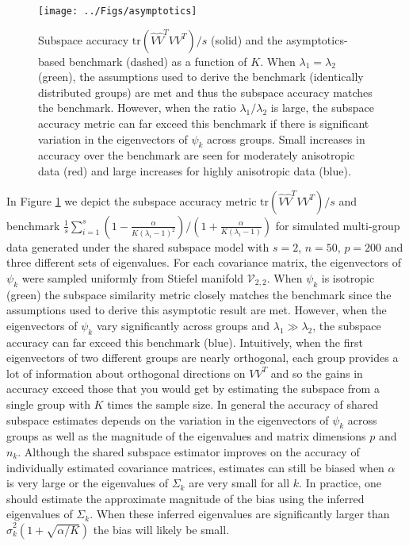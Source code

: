 \documentclass{statsoc}
\newcommand{\tr}{\text{tr}}
\begin{document}
\begin{figure}[t]
    \centering
    \texttt{[image: ../Figs/asymptotics]}
    \caption{Subspace accuracy $\tr(\hat{V}\hat{V}^TVV^T)/s$ (solid)
      and the asymptotics-based benchmark (dashed)
      as a function of $K$.  When
      $\lambda_1=\lambda_2$ (green), the assumptions used to derive
      the benchmark (identically distributed groups) are met and thus the
      subspace accuracy matches the benchmark.  However, when the
      ratio $\lambda_1/\lambda_2$ is large, the subspace accuracy
      metric can far exceed this benchmark if there is significant
      variation in the eigenvectors of $\psi_k$ across groups.  Small
      increases in accuracy over the benchmark are seen for moderately
      anisotropic data (red) and large increases for highly
      anisotropic data (blue).  }
      \label{fig:asymptotics}
\end{figure}


In Figure \ref{fig:asymptotics} we depict the subspace accuracy metric
$\tr(\hat{V}\hat{V}^TVV^T)/s$ and benchmark
$\frac{1}{s}\sum_{i=1}^s \left(1-\frac{\alpha}{K(\lambda_i -
    1)^2}\right) /\left(1 + \frac{\alpha}{K(\lambda_i - 1)}\right)$
for simulated multi-group data generated under the shared subspace
model with $s=2$, $n=50$, $p=200$ and three different sets of eigenvalues.  For each
covariance matrix, the eigenvectors of $\psi_k$ were sampled uniformly
from Stiefel manifold $\mathcal{V}_{2,2}$.  When $\psi_k$ is isotropic
(green) the subspace similarity metric closely matches the benchmark
since the assumptions used to derive this asymptotic result are met.
However, when the eigenvectors of $\psi_k$ vary significantly across
groups and $\lambda_1 \gg \lambda_2$, the subspace accuracy can far
exceed this benchmark (blue).  Intuitively, when the first
eigenvectors of two different groups are nearly orthogonal, each group
provides a lot of information about orthogonal directions on $VV^T$
and so the gains in accuracy exceed those that you would get by
estimating the subspace from a single group with $K$ times the sample
size.  In general the accuracy of shared subspace estimates depends on
the variation in the eigenvectors of $\psi_k$ across groups as well as
the magnitude of the eigenvalues and matrix dimensions $p$ and $n_k$.
Although the shared subspace estimator improves on the accuracy of
individually estimated covariance matrices, estimates can still be
biased when $\alpha$ is very large or the eigenvalues of $\Sigma_k$
are very small for all $k$.  In practice, one should estimate the
approximate magnitude of the bias using the inferred eigenvalues of $\Sigma_k$.  When
these inferred eigenvalues are significantly larger than
$\hat{\sigma}_k^2(1+\sqrt{\alpha/K})$ the bias will likely be small.
\end{document}
